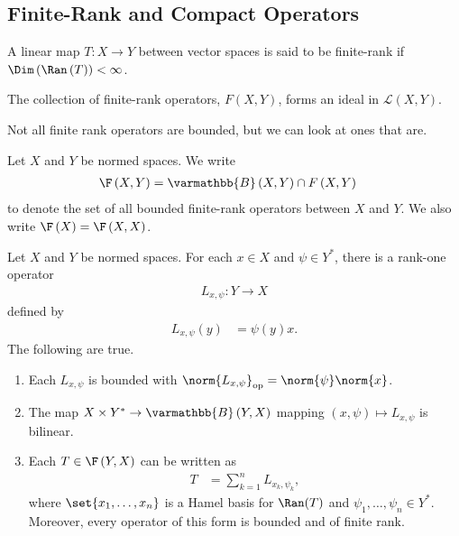 \documentclass[10pt]{mypackage}
\renewcommand*{\mathbb}[1]{\varmathbb{#1}}
\newcommand{\B}{\mathbb{B}}
\begin{document}
\subsection{Finite-Rank and Compact Operators}%
\begin{definition}
  A linear map $T: X\rightarrow Y$ between vector spaces is said to be finite-rank if $\Dim\left(\Ran\left(T\right)\right) < \infty$.\newline

  The collection of finite-rank operators, $F\left(X,Y\right)$, forms an ideal in $\mathcal{L}\left(X,Y\right)$.
\end{definition}
Not all finite rank operators are bounded, but we can look at ones that are.
\begin{definition}
  Let $X$ and $Y$ be normed spaces. We write
  \begin{align*}
    \F\left(X,Y\right) &= \B\left(X,Y\right)\cap F\left(X,Y\right)
  \end{align*}
  to denote the set of all bounded finite-rank operators between $X$ and $Y$. We also write $\F\left(X\right) = \F\left(X,X\right)$.
\end{definition}
\begin{proposition}
  Let $X$ and $Y$ be normed spaces. For each $x\in X$ and $\psi\in Y^{\ast}$, there is a rank-one operator
  \begin{align*}
    L_{x,\psi}: Y\rightarrow X
  \end{align*}
  defined by
  \begin{align*}
    L_{x,\psi}\left(y\right) &= \psi(y)x.
  \end{align*}
  The following are true.
  \begin{enumerate}[(1)]
    \item Each $L_{x,\psi}$ is bounded with $\norm{L_{x,\psi}}_{\text{op}} = \norm{\psi}\norm{x}$.
    \item The map $X\times Y^{\ast}\rightarrow \B\left(Y,X\right)$ mapping $\left(x,\psi\right)\mapsto L_{x,\psi}$ is bilinear.
    \item Each $T\in \F\left(Y,X\right)$ can be written as
      \begin{align*}
        T &= \sum_{k=1}^{n}L_{x_k,\psi_k},
      \end{align*}
      where $\set{x_1,\dots,x_n}$ is a Hamel basis for $\Ran(T)$ and $\psi_1,\dots,\psi_n\in Y^{\ast}$. Moreover, every operator of this form is bounded and of finite rank.
  \end{enumerate}
\end{proposition}
\end{document}
